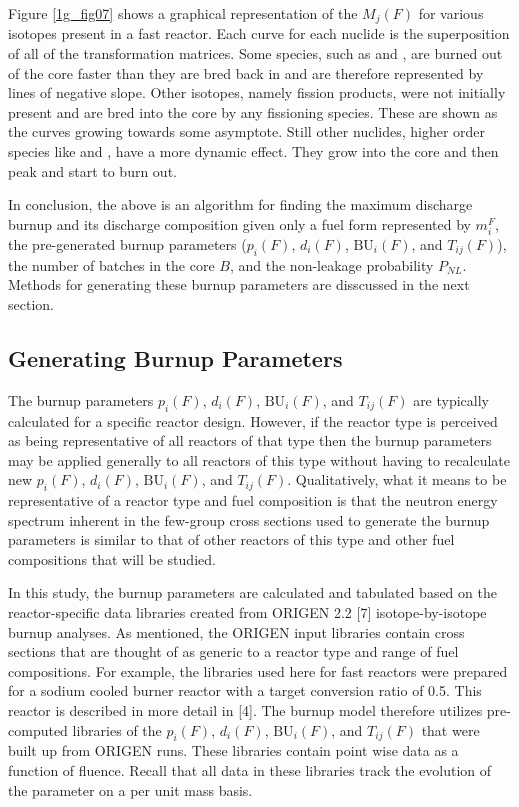 Figure \ref{1g_fig07} shows a graphical representation of the $M_j(F)$ for various isotopes present 
in a fast reactor.  Each curve for each nuclide is the superposition of all of the transformation 
matrices.  Some species, such as  and , 
are burned out of the core faster than they are bred back in and are therefore represented by lines of 
negative slope.  Other isotopes, namely fission products, were not initially present and are bred into 
the core by any fissioning species.  These are shown as the curves growing towards some asymptote.  
Still other nuclides, higher order species like  and , have a more dynamic effect.  
They grow into the core and then peak and start to burn out.  

In conclusion, the above is an algorithm for finding the maximum discharge burnup and its discharge 
composition given only a fuel form represented by $m_i^F$, the pre-generated burnup parameters ($p_i(F)$, 
$d_i(F)$, $\mbox{BU}_i(F)$, and $T_{ij}(F)$), the number of batches in the core $B$, and the non-leakage 
probability $P_{NL}$.  Methods for generating these burnup parameters are disscussed in the   
next section. 



\subsection{Generating Burnup Parameters}
\label{1g_sec:gen_BU_param}
The burnup parameters $p_i(F)$, $d_i(F)$, $\mbox{BU}_i(F)$, and $T_{ij}(F)$ are typically calculated 
for a specific reactor design.  However, if the reactor type is perceived as being representative of 
all reactors of that type then the burnup parameters may be applied generally to all reactors of this 
type without having to recalculate new $p_i(F)$, $d_i(F)$, $\mbox{BU}_i(F)$, and $T_{ij}(F)$.  
Qualitatively, what it means to be representative of a reactor type and fuel composition is that the 
neutron energy spectrum inherent in the few-group cross sections used to generate the burnup parameters 
is similar to that of other reactors of this type and other fuel compositions that will be studied.   

In this study, the burnup parameters are calculated and tabulated based on the reactor-specific data 
libraries created from ORIGEN 2.2 [7] isotope-by-isotope burnup analyses.  As mentioned, the ORIGEN 
input libraries contain cross sections that are thought of as generic to a reactor type and range of 
fuel compositions.  For example, the libraries used here for fast reactors were prepared for a sodium 
cooled burner reactor with a target conversion ratio of 0.5.  This reactor is described in more detail 
in [4].  The burnup model therefore utilizes pre-computed libraries of the $p_i(F)$, $d_i(F)$, 
$\mbox{BU}_i(F)$, and $T_{ij}(F)$ that were built up from ORIGEN runs.  These libraries contain point 
wise data as a function of fluence.  Recall that all data in these libraries track the evolution of the 
parameter on a per unit mass basis.


